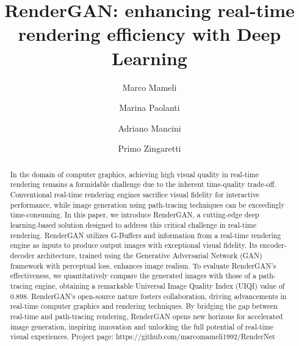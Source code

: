 \documentclass[format=acmsmall, review=false, screen=true]{acmart}
\begin{document}
\title[RenderGAN]{RenderGAN: enhancing real-time rendering efficiency with Deep Learning}

\author{Marco Mameli}

\author{Marina Paolanti}

\author{Adriano Mancini}

\author{Primo Zingaretti}


\begin{abstract}
In the domain of computer graphics, achieving high visual quality in real-time rendering remains a formidable challenge due to the inherent time-quality trade-off. Conventional real-time rendering engines sacrifice visual fidelity for interactive performance, while image generation using path-tracing techniques can be exceedingly time-consuming. In this paper, we introduce RenderGAN, a cutting-edge deep learning-based solution designed to address this critical challenge in real-time rendering. RenderGAN utilizes G-Buffers and information from a real-time rendering engine as inputs to produce output images with exceptional visual fidelity. Its encoder-decoder architecture, trained using the Generative Adversarial Network (GAN) framework with perceptual loss, enhances image realism. To evaluate RenderGAN's effectiveness, we quantitatively compare the generated images with those of a path-tracing engine, obtaining a remarkable Universal Image Quality Index (UIQI) value of 0.898. RenderGAN's open-source nature fosters collaboration, driving advancements in real-time computer graphics and rendering techniques. By bridging the gap between real-time and path-tracing rendering, RenderGAN opens new horizons for accelerated image generation, inspiring innovation and unlocking the full potential of real-time visual experiences.
Project page: https://github.com/marcomameli1992/RenderNet
\end{abstract}
\end{document}
